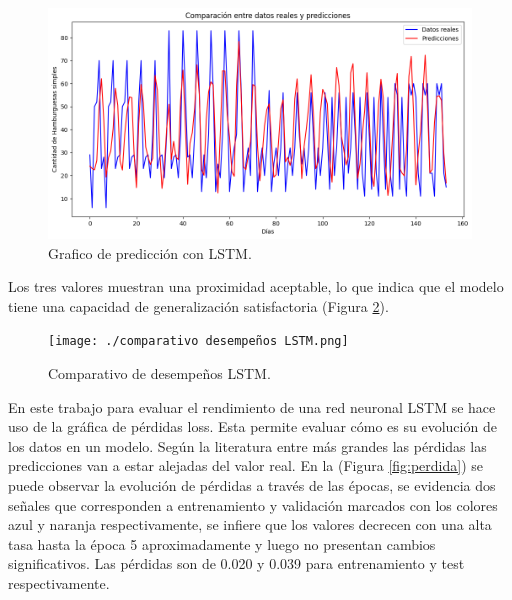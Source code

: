 


\begin{figure}[H]
  \begin{center}
    \includegraphics[scale=0.50]{./predicción 7 días.png}
    \caption{Grafico de predicción con LSTM.}
    \label{fig:grafico_lstm}
  \end{center}
\end{figure}

Los tres valores muestran una proximidad aceptable, lo que indica que el modelo tiene una capacidad de generalización satisfactoria (Figura \ref{fig:desenpeño}).
\begin{figure}[H]
  \begin{center}
    \texttt{[image: ./comparativo desempeños LSTM.png]}
    \caption{Comparativo de desempeños LSTM.}
    \label{fig:desenpeño}
  \end{center}
\end{figure}


En este trabajo para evaluar el rendimiento de una red neuronal LSTM se hace uso de la gráfica de pérdidas loss. Esta permite evaluar cómo es su evolución de los datos en un modelo. Según la literatura entre más grandes las pérdidas las predicciones van a estar alejadas del valor real. En la (Figura \ref{fig:perdida}) se puede observar la evolución de pérdidas a través de las épocas, se evidencia dos señales que corresponden a entrenamiento y validación marcados con los colores azul y naranja respectivamente, se infiere que los valores decrecen con una alta tasa hasta la época 5 aproximadamente y luego no presentan cambios significativos. Las pérdidas son de 0.020 y 0.039 para entrenamiento y test respectivamente.

